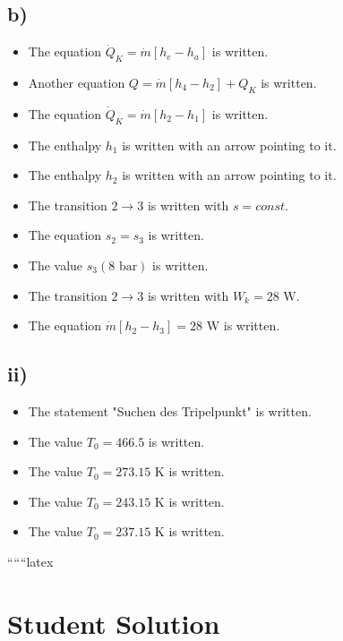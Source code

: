

\subsection*{b)}

\begin{itemize}
    \item The equation $\dot{Q}_K = \dot{m} \left[ h_e - h_a \right]$ is written.
    \item Another equation $Q = \dot{m} \left[ h_4 - h_2 \right] + Q_K$ is written.
    \item The equation $\dot{Q}_K = \dot{m} \left[ h_2 - h_1 \right]$ is written.
    \item The enthalpy $h_1$ is written with an arrow pointing to it.
    \item The enthalpy $h_2$ is written with an arrow pointing to it.
    \item The transition $2 \rightarrow 3$ is written with $s = const$.
    \item The equation $s_2 = s_3$ is written.
    \item The value $s_3 (8 \text{ bar})$ is written.
    \item The transition $2 \rightarrow 3$ is written with $W_k = 28 \text{ W}$.
    \item The equation $\dot{m} \left[ h_2 - h_3 \right] = 28 \text{ W}$ is written.
\end{itemize}

\subsection*{ii)}

\begin{itemize}
    \item The statement "Suchen des Tripelpunkt" is written.
    \item The value $T_0 = 466.5$ is written.
    \item The value $T_0 = 273.15 \text{ K}$ is written.
    \item The value $T_0 = 243.15 \text{ K}$ is written.
    \item The value $T_0 = 237.15 \text{ K}$ is written.
\end{itemize}

``````latex


\section*{Student Solution}